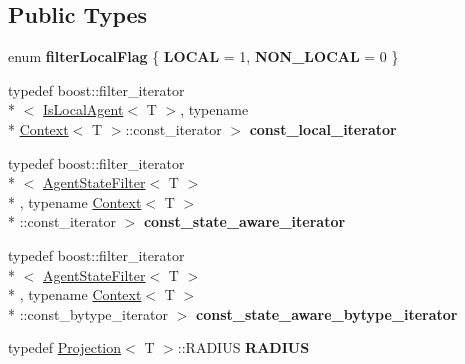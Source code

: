 \subsection*{Public Types}
\begin{DoxyCompactItemize}
\item 
enum {\bfseries filter\-Local\-Flag} \{ {\bfseries L\-O\-C\-A\-L} = 1, 
{\bfseries N\-O\-N\-\_\-\-L\-O\-C\-A\-L} = 0
 \}
\item 
\hypertarget{classrepast_1_1_shared_context_a841565813e336d28a9fd13197652928f}{typedef boost\-::filter\-\_\-iterator\\*
$<$ \hyperlink{structrepast_1_1_is_local_agent}{Is\-Local\-Agent}$<$ T $>$, typename \\*
\hyperlink{classrepast_1_1_context}{Context}$<$ T $>$\-::const\-\_\-iterator $>$ {\bfseries const\-\_\-local\-\_\-iterator}}\label{classrepast_1_1_shared_context_a841565813e336d28a9fd13197652928f}

\item 
\hypertarget{classrepast_1_1_shared_context_ab40b787c7ec2f70cbad6f50827c15c09}{typedef boost\-::filter\-\_\-iterator\\*
$<$ \hyperlink{structrepast_1_1_agent_state_filter}{Agent\-State\-Filter}$<$ T $>$\\*
, typename \hyperlink{classrepast_1_1_context}{Context}$<$ T $>$\\*
\-::const\-\_\-iterator $>$ {\bfseries const\-\_\-state\-\_\-aware\-\_\-iterator}}\label{classrepast_1_1_shared_context_ab40b787c7ec2f70cbad6f50827c15c09}

\item 
\hypertarget{classrepast_1_1_shared_context_a0cd1a3df6a563cb2fbd6cbe5498fbe90}{typedef boost\-::filter\-\_\-iterator\\*
$<$ \hyperlink{structrepast_1_1_agent_state_filter}{Agent\-State\-Filter}$<$ T $>$\\*
, typename \hyperlink{classrepast_1_1_context}{Context}$<$ T $>$\\*
\-::const\-\_\-bytype\-\_\-iterator $>$ {\bfseries const\-\_\-state\-\_\-aware\-\_\-bytype\-\_\-iterator}}\label{classrepast_1_1_shared_context_a0cd1a3df6a563cb2fbd6cbe5498fbe90}

\item 
\hypertarget{classrepast_1_1_shared_context_a4d4876295de6ffeaa5cc3a5619cc01be}{typedef \hyperlink{classrepast_1_1_projection}{Projection}$<$ T $>$\-::R\-A\-D\-I\-U\-S {\bfseries R\-A\-D\-I\-U\-S}}\label{classrepast_1_1_shared_context_a4d4876295de6ffeaa5cc3a5619cc01be}

\end{DoxyCompactItemize}
